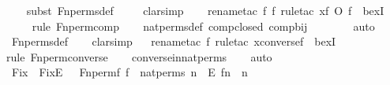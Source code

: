\begin{isabellebody}
\ \ \ \isamarkupfalse%
{\isacharparenleft}{\kern0pt}subst\ Fn{\isacharunderscore}{\kern0pt}perms{\isacharunderscore}{\kern0pt}def{\isacharparenright}{\kern0pt}{\isacharplus}{\kern0pt}\isanewline
\ \ \ \isamarkupfalse%
\ clarsimp\isanewline
\ \ \ \isamarkupfalse%
{\isacharparenleft}{\kern0pt}rename{\isacharunderscore}{\kern0pt}tac\ f\ f{\isacharprime}{\kern0pt}{\isacharcomma}{\kern0pt}\ rule{\isacharunderscore}{\kern0pt}tac\ x{\isacharequal}{\kern0pt}{\isachardoublequoteopen}f\ O\ f{\isacharprime}{\kern0pt}{\isachardoublequoteclose}\ \ bexI{\isacharparenright}{\kern0pt}\isanewline
\ \ \ \ \isamarkupfalse%
{\isacharparenleft}{\kern0pt}rule\ Fn{\isacharunderscore}{\kern0pt}perm{\isacharprime}{\kern0pt}{\isacharunderscore}{\kern0pt}comp{\isacharparenright}{\kern0pt}\isanewline
\ \ \isamarkupfalse%
\ nat{\isacharunderscore}{\kern0pt}perms{\isacharunderscore}{\kern0pt}def\ comp{\isacharunderscore}{\kern0pt}closed\ comp{\isacharunderscore}{\kern0pt}bij\ \isanewline
\ \ \ \ \ \isamarkupfalse%
\ auto{\isacharbrackleft}{\kern0pt}{}{\isacharbrackright}{\kern0pt}\isanewline
\ \ \isamarkupfalse%
\ Fn{\isacharunderscore}{\kern0pt}perms{\isacharunderscore}{\kern0pt}def\ \isanewline
\ \ \isamarkupfalse%
{\isacharparenleft}{\kern0pt}clarsimp{\isacharparenright}{\kern0pt}\isanewline
\ \ \isamarkupfalse%
{\isacharparenleft}{\kern0pt}rename{\isacharunderscore}{\kern0pt}tac\ f{\isacharcomma}{\kern0pt}\ rule{\isacharunderscore}{\kern0pt}tac\ x{\isacharequal}{\kern0pt}{\isachardoublequoteopen}converse{\isacharparenleft}{\kern0pt}f{\isacharparenright}{\kern0pt}{\isachardoublequoteclose}\ \ bexI{\isacharparenright}{\kern0pt}\isanewline
\ \ \ \isamarkupfalse%
{\isacharparenleft}{\kern0pt}rule\ Fn{\isacharunderscore}{\kern0pt}perm{\isacharprime}{\kern0pt}{\isacharunderscore}{\kern0pt}converse{\isacharparenright}{\kern0pt}\isanewline
\ \ \isamarkupfalse%
\ converse{\isacharunderscore}{\kern0pt}in{\isacharunderscore}{\kern0pt}nat{\isacharunderscore}{\kern0pt}perms\isanewline
\ \ \isamarkupfalse%
\ auto%
\endisatagproof
{\isafoldproof}%
%
\isadelimproof
\isanewline
%
\endisadelimproof
\isanewline
{}\isamarkupfalse%
\ Fix\ \ {\isachardoublequoteopen}Fix{\isacharparenleft}{\kern0pt}E{\isacharparenright}{\kern0pt}\ {\isasymequiv}\ {\isacharbraceleft}{\kern0pt}\ Fn{\isacharunderscore}{\kern0pt}perm{\isacharprime}{\kern0pt}{\isacharparenleft}{\kern0pt}f{\isacharparenright}{\kern0pt}{\isachardot}{\kern0pt}{\isachardot}{\kern0pt}\ f\ {\isasymin}\ nat{\isacharunderscore}{\kern0pt}perms{\isacharcomma}{\kern0pt}\ {\isasymforall}n\ {\isasymin}\ E{\isachardot}{\kern0pt}\ f{\isacharbackquote}{\kern0pt}n\ {\isacharequal}{\kern0pt}\ n\ {\isacharbraceright}{\kern0pt}{\isachardoublequoteclose}\isanewline

\end{isabellebody}
